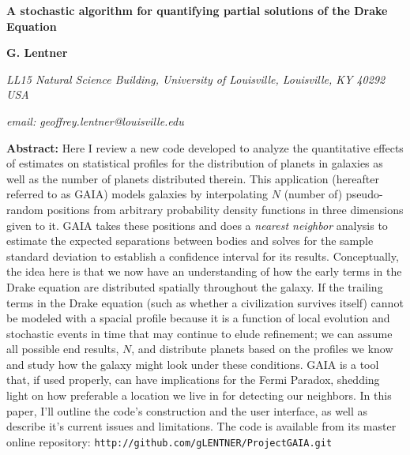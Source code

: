\documentclass[10pt,a4paper,final]{article}
\numberwithin{equation}{section}
\begin{document}
	
	\thispagestyle{plain}

	\begin{flushleft}
		\LARGE{\textbf{A stochastic algorithm for quantifying partial solutions
		of the Drake Equation}}
	\end{flushleft}
	
	\noindent\makebox[\linewidth]{\rule{\textwidth}{0.75pt}}

	\bigskip
		
	\begin{flushright}
	\begin{minipage}[t]{0.85\textwidth}	
		\par{\Large{\textbf{G. Lentner}}\par}
		\bigskip
		\par{\small{\textit{
				LL15 Natural Science Building, University of Louisville,
				Louisville, KY 40292 USA}}\par}
		\par{\small{\textit{
				email: geoffrey.lentner@louisville.edu}}\par}
	\end{minipage}
	\end{flushright}

	\vspace{\baselineskip}

	\begin{flushright}
	\begin{minipage}[t]{0.85\textwidth}
		\textbf{Abstract: } Here I review a new code developed to analyze 
		the quantitative effects of estimates on statistical profiles for the distribution
		of planets in galaxies as well 
		as the number of planets distributed therein. This application (hereafter referred 
		to as GAIA) models galaxies by interpolating $N$ (number of) pseudo-random 
		positions from arbitrary probability density functions in three dimensions given
		to it. GAIA takes these positions and does a \textit{nearest neighbor} analysis
		to estimate the expected separations between bodies and solves for the sample 
		standard deviation to establish a confidence interval for its results. 
		Conceptually, the idea here is that we now have an understanding of how 
		the early terms in the Drake equation are distributed spatially throughout the galaxy.
		If the trailing terms in the Drake equation (such as whether a civilization 
		survives itself) cannot be modeled with a spacial profile because it is a function 
		of local evolution and stochastic events in time that may continue to elude refinement; 
		we can assume all possible end results, $N$, and 
		distribute planets based on the profiles we know and study how the galaxy might look
		under these conditions.
		GAIA is a tool that, if used properly, can have implications for the Fermi Paradox,
		shedding light on how preferable a location we live in for detecting our neighbors.
		In this paper, I'll outline the code's construction and the user interface, as well
		as describe it's current issues and limitations. The code is available from its
		master online repository: \texttt{\small http://github.com/gLENTNER/ProjectGAIA.git}
	\end{minipage}
	\end{flushright}
\end{document}

